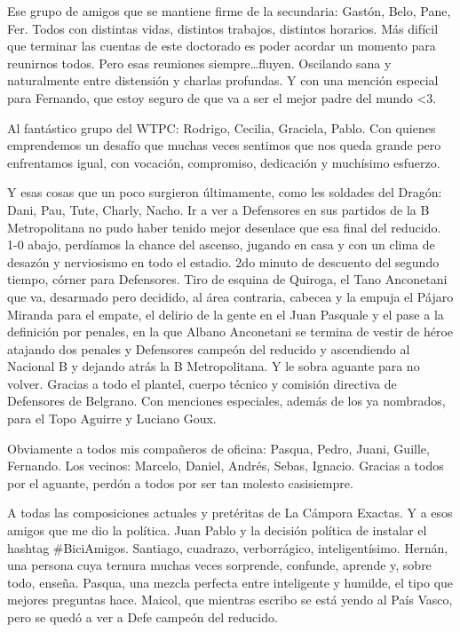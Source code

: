 Ese grupo de amigos que se mantiene firme de la secundaria: Gastón, Belo, Pane, Fer.
Todos con distintas vidas, distintos trabajos, distintos horarios.
Más difícil que terminar las cuentas de este doctorado es poder acordar un momento para reunirnos todos.
Pero esas reuniones siempre\ldots fluyen.
Oscilando sana y naturalmente entre distensión y charlas profundas.
Y con una mención especial para Fernando, que estoy seguro de que va a ser el mejor padre del mundo <3.

Al fantástico grupo del WTPC: Rodrigo, Cecilia, Graciela, Pablo.
Con quienes emprendemos un desafío que muchas veces sentimos que nos queda grande pero enfrentamos igual, con vocación, compromiso, dedicación y muchísimo esfuerzo.

Y esas cosas que un poco surgieron últimamente, como les soldades del Dragón: Dani, Pau, Tute, Charly, Nacho.
Ir a ver a Defensores en sus partidos de la B Metropolitana no pudo haber tenido mejor desenlace que esa final del reducido.
1-0 abajo, perdíamos la chance del ascenso, jugando en casa y con un clima de desazón y nerviosismo en todo el estadio.
2do minuto de descuento del segundo tiempo, córner para Defensores.
Tiro de esquina de Quiroga, el Tano Anconetani que va, desarmado pero decidido, al área contraria, cabecea y la empuja el Pájaro Miranda para el empate, el delirio de la gente en el Juan Pasquale y el pase a la definición por penales, en la que Albano Anconetani se termina de vestir de héroe atajando dos penales y Defensores campeón del reducido y ascendiendo al Nacional B y dejando atrás la B Metropolitana.
Y le sobra aguante para no volver.
Gracias a todo el plantel, cuerpo técnico y comisión directiva de Defensores de Belgrano.
Con menciones especiales, además de los ya nombrados, para el Topo Aguirre y Luciano Goux.

Obviamente a todos mis compañeros de oficina: Pasqua, Pedro, Juani, Guille, Fernando.
Los vecinos: Marcelo, Daniel, Andrés, Sebas, Ignacio.
Gracias a todos por el aguante, perdón a todos por ser tan molesto casisiempre.

A todas las composiciones actuales y pretéritas de La Cámpora Exactas.
Y a esos amigos que me dio la política.
Juan Pablo y la decisión política de instalar el hashtag \#BiciAmigos.
Santiago, cuadrazo, verborrágico, inteligentísimo.
Hernán, una persona cuya ternura muchas veces sorprende, confunde, aprende y, sobre todo, enseña.
Pasqua, una mezcla perfecta entre inteligente y humilde, el tipo que mejores preguntas hace.
Maicol, que mientras escribo se está yendo al País Vasco, pero se quedó a ver a Defe campeón del reducido.



